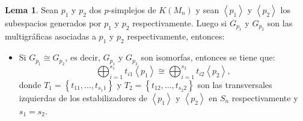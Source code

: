 \documentclass[12pt]{book}
\theoremstyle{definition}
\newtheorem{lemma}[theorem]{Lema}
\newcounter{in}
\begin{document}
\begin{lemma}
\label{lema_s_n}
Sean $p_{1}$ y $p_{2}$ dos $p$-simplejos de $K(M_{n})$ y sean $\left
\langle p_{1} \right \rangle$ y $\left \langle p_{2} \right \rangle$
los subespacios generados por $p_{1}$ y $p_{2}$ respectivamente. Luego
si $G_{p_{1}}$ y $G_{p_{2}}$ son las multigráficas asociadas a $p_{1}$ y $p_{2}$
respectivamente, entonces:
\begin{itemize}
\item Si $G_{p_{1}} \cong G_{p_{2}}$, es decir, $G_{p_{1}}$ y $G_{p_{2}}$ son isomorfas, entonces se tiene que:
$$\bigoplus_{i=1}^{s_{1}} t_{i1}  \left \langle p_{1} \right \rangle \cong \bigoplus_{i=1}^{s_{2}} t_{i2} \left \langle p_{2} \right \rangle,$$
donde $T_{1} = \left \{ t_{11}, \ldots, t_{s_{1}1} \right \}$ y
$T_{2} = \left \{ t_{12}, \ldots, t_{s_{2}2} \right \}$ son las
transversales izquierdas de los estabilizadores de
$\left \langle p_{1} \right \rangle$ y
$\left \langle p_{2} \right \rangle$ en $S_{n}$ respectivamente y
$s_{1} = s_{2}$.
\end{itemize} 
\end{lemma}
\end{document}

